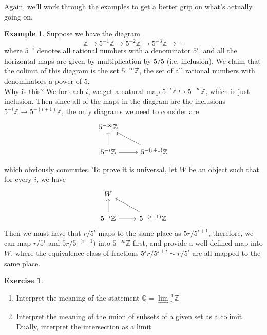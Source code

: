\documentclass[psamsfonts]{amsart}
\theoremstyle{definition}
\newtheorem{exmp}[thm]{Example}
\newtheorem{exer}[thm]{Exercise}
\theoremstyle{remark}
\newcommand{\Q}{\mathbb{Q}}
\newcommand{\Z}{\mathbb{Z}}
\newcommand{\inv}{^{-1}}
\newcommand{\enumbreak}{\ \\ \vspace{-\baselineskip}}
\begin{document}
Again, we'll work through the examples to get a better grip on what's actually going on.
\begin{exmp}
Suppose we have the diagram
$$\Z \to 5\inv\Z \to 5^{-2}\Z \to 5^{-3}\Z \to \cdots$$
where $5^{-i}$ denotes all rational numbers with a denominator $5^i$, and all the horizontal maps are given by multiplication by $5/5$ (i.e. inclusion). We claim that the colimit of this diagram is the set $5^{-\infty}\Z$, the set of all rational numbers with denominators a power of $5$. \\

Why is this? We for each $i$, we get a natural map $5^{-i}\Z \hookrightarrow 5^{-\infty}\Z$, which is just inclusion. Then since all of the maps in the diagram are the inclusions $5^{-i}\Z \to 5^{-(i+1)}\Z$, the only diagrams we need to consider are
$$\begin{tikzcd}
5^{-\infty}\Z \\
5^{-i}\Z \arrow[u] \arrow[r] & 5^{-(i + 1)}\Z \arrow[ul]
\end{tikzcd}$$
\end{exmp}
which obviously commutes. To prove it is universal, let $W$ be an object such that for every $i$, we have
$$\begin{tikzcd}
W \\
5^{-i}\Z \arrow[u] \arrow[r] & 5^{-(i + 1)}\Z \arrow[ul]
\end{tikzcd}$$
Then we must have that $r/5^{i}$ maps to the same place as $5r/5^{i+1}$, therefore, we can map $r/5^i$ and $5r/5^{-(i+1})$ into $5^{-\infty}\Z$ first, and provide a well defined map into $W$, where the equivalence class of fractions $5^jr/5^{j+i} \sim r/5^i$ are all mapped to the same place.
%
\begin{exer} \enumbreak
\begin{enumerate}
\item Interpret the meaning of the statement $\Q = \lim\limits_\to \frac{1}{n}\Z$
\item Interpret the meaning of the union of subsets of a given set as a colimit. Dually, interpret the intersection as a limit
\end{enumerate}
\end{exer}
%
\end{document}
